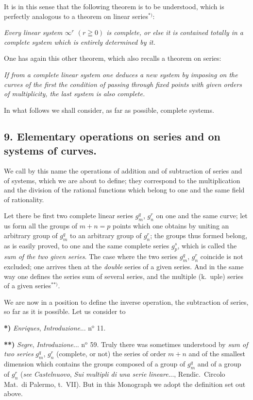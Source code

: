 \documentclass{article}
\begin{document}
It is in this sense that the following theorem is to be understood, which is perfectly analogous to a theorem on linear series${}^{*)}$:

\emph{Every linear system $\infty^{r}$ $(r \geqq 0)$ is complete, or else it is contained totally in a complete system which is entirely determined by it.}

One has again this other theorem, which also recalls a theorem on series:

\emph{If from a complete linear system one deduces a new system by imposing on the curves of the first the condition of passing through fixed points with given orders of multiplicity, the last system is also complete.}

In what follows we shall consider, as far as possible, complete systems.

\subsection*{9. Elementary operations on series and on systems of curves.}

We call by this name the operations of addition and of subtraction of series and of systems, which we are about to define; they correspond to the multiplication and the division of the rational functions which belong to one and the same field of rationality.

Let there be first two complete linear series $g_{m}^{q}$, $g_{n}^{r}$ on one and the same curve; let us form all the groups of $m + n = p$ points which one obtains by uniting an arbitrary group of $g_{m}^{q}$ to an arbitrary group of $g_{n}^{r}$; the groups thus formed belong, as is easily proved, to one and the same complete series $g_{p}^{s}$, which is called the \emph{sum of the two given series}. The case where the two series $g_{m}^{q}$, $g_{n}^{r}$ coincide is not excluded; one arrives then at the \emph{double} series of a given series. And in the same way one defines the series sum of several series, and the multiple (k.\ uple) series of a given series${}^{**)}$.

We are now in a position to define the inverse operation, the subtraction of series, so far as it is possible. Let us consider to

\textbf{*)} \emph{Enriques}, \emph{Introduzione}... n${}^{\text{o}}$ 11.

\textbf{**)} \emph{Segre}, \emph{Introduzione}... n${}^{\text{o}}$ 59. Truly there was sometimes understood by \emph{sum of two series} $g_{m}^{q}$, $g_{n}^{r}$ (complete, or not) the series of order $m + n$ and of the smallest dimension which contains the groups composed of a group of $g_{m}^{q}$ and of a group of $g_{n}^{r}$ (\emph{see} \emph{Castelnuovo}, \emph{Sui multipli di una serie lineare}..., Rendic.\ Circolo Mat.\ di Palermo, t.\ VII). But in this Monograph we adopt the definition set out above.
\end{document}
